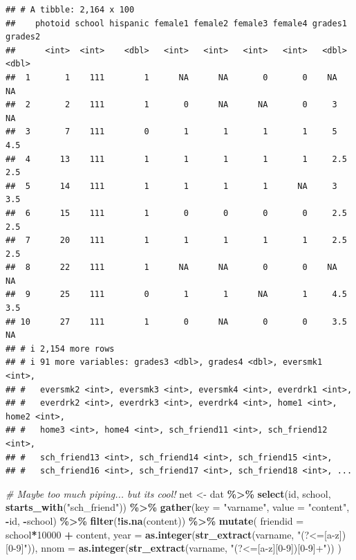 \documentclass[
]{book}
\newenvironment{Shaded}{\begin{snugshade}}{\end{snugshade}}
\newcommand{\AttributeTok}[1]{\textcolor[rgb]{0.13,0.29,0.53}{#1}}
\newcommand{\CommentTok}[1]{\textcolor[rgb]{0.56,0.35,0.01}{\textit{#1}}}
\newcommand{\DecValTok}[1]{\textcolor[rgb]{0.00,0.00,0.81}{#1}}
\newcommand{\FunctionTok}[1]{\textcolor[rgb]{0.13,0.29,0.53}{\textbf{#1}}}
\newcommand{\NormalTok}[1]{#1}
\newcommand{\OtherTok}[1]{\textcolor[rgb]{0.56,0.35,0.01}{#1}}
\newcommand{\SpecialCharTok}[1]{\textcolor[rgb]{0.81,0.36,0.00}{\textbf{#1}}}
\newcommand{\StringTok}[1]{\textcolor[rgb]{0.31,0.60,0.02}{#1}}
\begin{document}
\begin{verbatim}
## # A tibble: 2,164 x 100
##    photoid school hispanic female1 female2 female3 female4 grades1 grades2
##      <int>  <int>    <dbl>   <int>   <int>   <int>   <int>   <dbl>   <dbl>
##  1       1    111        1      NA      NA       0       0    NA      NA  
##  2       2    111        1       0      NA      NA       0     3      NA  
##  3       7    111        0       1       1       1       1     5       4.5
##  4      13    111        1       1       1       1       1     2.5     2.5
##  5      14    111        1       1       1       1      NA     3       3.5
##  6      15    111        1       0       0       0       0     2.5     2.5
##  7      20    111        1       1       1       1       1     2.5     2.5
##  8      22    111        1      NA      NA       0       0    NA      NA  
##  9      25    111        0       1       1      NA       1     4.5     3.5
## 10      27    111        1       0      NA       0       0     3.5    NA  
## # i 2,154 more rows
## # i 91 more variables: grades3 <dbl>, grades4 <dbl>, eversmk1 <int>,
## #   eversmk2 <int>, eversmk3 <int>, eversmk4 <int>, everdrk1 <int>,
## #   everdrk2 <int>, everdrk3 <int>, everdrk4 <int>, home1 <int>, home2 <int>,
## #   home3 <int>, home4 <int>, sch_friend11 <int>, sch_friend12 <int>,
## #   sch_friend13 <int>, sch_friend14 <int>, sch_friend15 <int>,
## #   sch_friend16 <int>, sch_friend17 <int>, sch_friend18 <int>, ...
\end{verbatim}

\begin{Shaded}
\begin{Highlighting}[]
\CommentTok{\# Maybe too much piping... but its cool!}
\NormalTok{net }\OtherTok{\textless{}{-}}\NormalTok{ dat }\SpecialCharTok{\%\textgreater{}\%} 
  \FunctionTok{select}\NormalTok{(id, school, }\FunctionTok{starts\_with}\NormalTok{(}\StringTok{"sch\_friend"}\NormalTok{)) }\SpecialCharTok{\%\textgreater{}\%}
  \FunctionTok{gather}\NormalTok{(}\AttributeTok{key =} \StringTok{"varname"}\NormalTok{, }\AttributeTok{value =} \StringTok{"content"}\NormalTok{, }\SpecialCharTok{{-}}\NormalTok{id, }\SpecialCharTok{{-}}\NormalTok{school) }\SpecialCharTok{\%\textgreater{}\%}
  \FunctionTok{filter}\NormalTok{(}\SpecialCharTok{!}\FunctionTok{is.na}\NormalTok{(content)) }\SpecialCharTok{\%\textgreater{}\%}
  \FunctionTok{mutate}\NormalTok{(}
    \AttributeTok{friendid =}\NormalTok{ school}\SpecialCharTok{*}\DecValTok{10000} \SpecialCharTok{+}\NormalTok{ content,}
    \AttributeTok{year     =} \FunctionTok{as.integer}\NormalTok{(}\FunctionTok{str\_extract}\NormalTok{(varname, }\StringTok{"(?\textless{}=[a{-}z])[0{-}9]"}\NormalTok{)),}
    \AttributeTok{nnom     =} \FunctionTok{as.integer}\NormalTok{(}\FunctionTok{str\_extract}\NormalTok{(varname, }\StringTok{"(?\textless{}=[a{-}z][0{-}9])[0{-}9]+"}\NormalTok{))}
\NormalTok{  )}
\end{Highlighting}
\end{Shaded}
\end{document}
